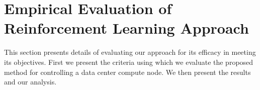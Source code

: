 \section{Empirical Evaluation of Reinforcement Learning Approach}
\label{sec:Eval}

This section presents details of evaluating our approach for its efficacy in meeting its objectives.
First we present the criteria using which we evaluate the proposed method for controlling a data center compute node. 
We then present the results and our analysis.

